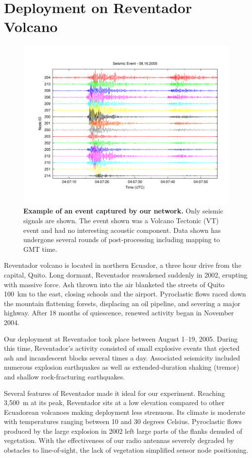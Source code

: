 \section{Deployment on Reventador Volcano}
\label{evaluation-sec-deployment}

\begin{figure}[t]
\begin{center}
\includegraphics[width=0.7\hsize]{./3-evaluation/figs/event.pdf}
\end{center}
\caption{\textbf{Example of an event captured by our network.} Only seismic
signals are shown. The event shown was a Volcano Tectonic (VT) event and had
no interesting acoustic component. Data shown has undergone several rounds of
post-processing including mapping to GMT time.}
\label{evaluation-fig-event}
\end{figure}

Reventador volcano is located in northern Ecuador, a three hour drive from
the capital, Quito. Long dormant, Reventador reawakened suddenly in 2002,
erupting with massive force. Ash thrown into the air blanketed the streets of
Quito 100~km to the east, closing schools and the airport. Pyroclastic flows
raced down the mountain flattening forests, displacing an oil pipeline, and
severing a major highway. After 18 months of quiescence, renewed activity
began in November 2004.

Our deployment at Reventador took place between August 1--19, 2005. During
this time, Reventador's activity consisted of small explosive events that
ejected ash and incandescent blocks several times a day. Associated
seismicity included numerous explosion earthquakes as well as
extended-duration shaking (tremor) and shallow rock-fracturing earthquakes.

Several features of Reventador made it ideal for our experiment. Reaching
3,500~m at its peak, Reventador sits at a low elevation compared to other
Ecuadorean volcanoes making deployment less strenuous. Its climate is
moderate with temperatures ranging between 10 and 30 degrees Celsius.
Pyroclastic flows produced by the large explosion in 2002 left large parts of
the flanks denuded of vegetation. With the effectiveness of our radio
antennas severely degraded by obstacles to line-of-sight, the lack of
vegetation simplified sensor node positioning.


